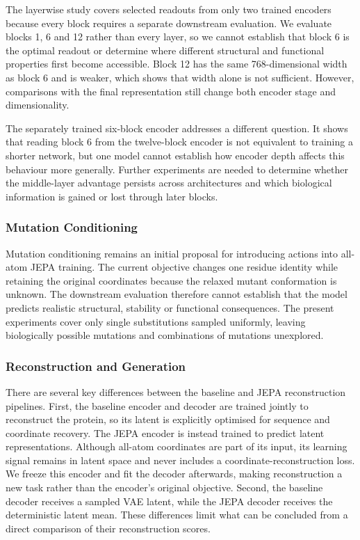 The layerwise study covers selected readouts from only two trained encoders because every block requires a separate downstream evaluation. We evaluate blocks 1, 6 and 12 rather than every layer, so we cannot establish that block 6 is the optimal readout or determine where different structural and functional properties first become accessible. Block 12 has the same 768-dimensional width as block 6 and is weaker, which shows that width alone is not sufficient. However, comparisons with the final representation still change both encoder stage and dimensionality.

The separately trained six-block encoder addresses a different question. It shows that reading block 6 from the twelve-block encoder is not equivalent to training a shorter network, but one model cannot establish how encoder depth affects this behaviour more generally. Further experiments are needed to determine whether the middle-layer advantage persists across architectures and which biological information is gained or lost through later blocks.

\subsubsection{Mutation Conditioning}

Mutation conditioning remains an initial proposal for introducing actions into all-atom JEPA training. The current objective changes one residue identity while retaining the original coordinates because the relaxed mutant conformation is unknown. The downstream evaluation therefore cannot establish that the model predicts realistic structural, stability or functional consequences. The present experiments cover only single substitutions sampled uniformly, leaving biologically possible mutations and combinations of mutations unexplored.

\subsubsection{Reconstruction and Generation}
\label{sec:limitations-reconstruction}

There are several key differences between the baseline and JEPA reconstruction pipelines. First, the baseline encoder and decoder are trained jointly to reconstruct the protein, so its latent is explicitly optimised for sequence and coordinate recovery. The JEPA encoder is instead trained to predict latent representations. Although all-atom coordinates are part of its input, its learning signal remains in latent space and never includes a coordinate-reconstruction loss. We freeze this encoder and fit the decoder afterwards, making reconstruction a new task rather than the encoder's original objective. Second, the baseline decoder receives a sampled VAE latent, while the JEPA decoder receives the deterministic latent mean. These differences limit what can be concluded from a direct comparison of their reconstruction scores.

